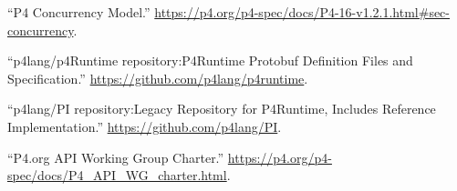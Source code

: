 \documentclass[11pt]{article}
\begin{document}
{{\begin{thebibliography}{39}
\mdbibitemlabel{{}[14]}\textquotedblleft{}P4 Concurrency Model.\textquotedblright{} \href{https://p4.org/p4-spec/docs/P4-16-v1.2.1.html\%23sec-concurrency}{{\ttfamily https://\hspace{0pt}p4.\hspace{0pt}org/\hspace{0pt}p4-\hspace{0pt}spec/\hspace{0pt}docs/\hspace{0pt}P4-\hspace{0pt}16-\hspace{0pt}v1.\hspace{0pt}2.\hspace{0pt}1.\hspace{0pt}html\#\hspace{0pt}sec-\hspace{0pt}concurrency}}.\label{p4concurrency}%

\mdbibitemlabel{{}[15]}\textquotedblleft{}p4lang/p4Runtime repository:P4Runtime Protobuf Definition Files and Specification.\textquotedblright{} \href{https://github.com/p4lang/p4runtime}{{\ttfamily https://\hspace{0pt}github.\hspace{0pt}com/\hspace{0pt}p4lang/\hspace{0pt}p4runtime}}.\label{p4runtimerepo}%

\mdbibitemlabel{{}[16]}\textquotedblleft{}p4lang/PI repository:Legacy Repository for P4Runtime, Includes Reference Implementation.\textquotedblright{} \href{https://github.com/p4lang/PI}{{\ttfamily https://\hspace{0pt}github.\hspace{0pt}com/\hspace{0pt}p4lang/\hspace{0pt}PI}}.\label{pirepo}%

\mdbibitemlabel{{}[17]}\textquotedblleft{}P4.org API Working Group Charter.\textquotedblright{} \href{https://p4.org/p4-spec/docs/P4_API_WG_charter.html}{{\ttfamily https://\hspace{0pt}p4.\hspace{0pt}org/\hspace{0pt}p4-\hspace{0pt}spec/\hspace{0pt}docs/\hspace{0pt}P4\_\hspace{0pt}API\_\hspace{0pt}WG\_\hspace{0pt}charter.\hspace{0pt}html}}.\label{p4apiwgcharter}%


\end{thebibliography}}}
\end{document}
